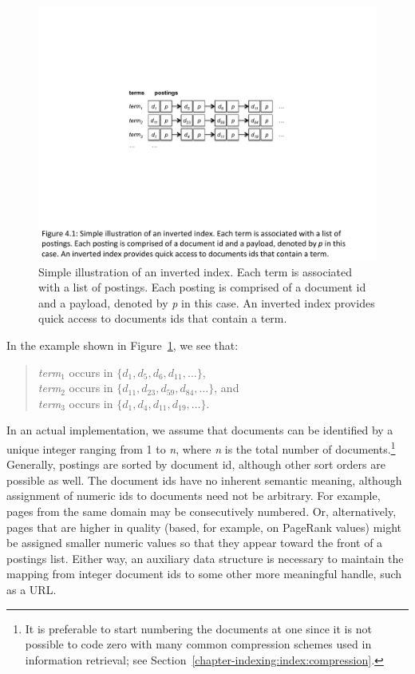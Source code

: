 \begin{figure}[t]
\begin{center}
\includegraphics[scale=0.75]{figures/fig-ch4-indexing-inverted-index.pdf}
\end{center}
\caption{Simple illustration of an inverted index.  Each term is
  associated with a list of postings.  Each posting is comprised of a
  document id and a payload, denoted by \emph{p} in this case.  An
  inverted index provides quick access to documents ids that contain a
  term.}
\label{chapter-indexing:inverted-index}
\end{figure}

In the example shown in Figure~\ref{chapter-indexing:inverted-index},
we see that:
\begin{quote}
\emph{term}$_1$ occurs in $\{d_1, d_5, d_6, d_{11}, \ldots\}$, \\
\emph{term}$_2$ occurs in $\{d_{11}, d_{23}, d_{59}, d_{84}, \ldots\}$, and \\
\emph{term}$_3$ occurs in $\{d_1, d_4, d_{11}, d_{19}, \ldots\}$.
\end{quote}

In an actual implementation, we assume that documents can
be identified by a unique integer ranging from 1 to \emph{n}, where
\emph{n} is the total number of documents.\footnote{It is preferable to
  start numbering the documents at one since it is not possible to
  code zero with many common compression schemes used in information
  retrieval; see Section~\ref{chapter-indexing:index:compression}.}
Generally, postings are sorted by document id, although other sort
orders are possible as well.  The document ids have no inherent
semantic meaning, although assignment of numeric ids to documents need
not be arbitrary.  For example, pages from the same domain may be
consecutively numbered.  Or, alternatively, pages that are higher in
quality (based, for example, on PageRank values) might be assigned
smaller numeric values so that they appear toward the front of a
postings list.  Either way, an auxiliary data structure is necessary
to maintain the mapping from integer document ids to some other more
meaningful handle, such as a URL.

